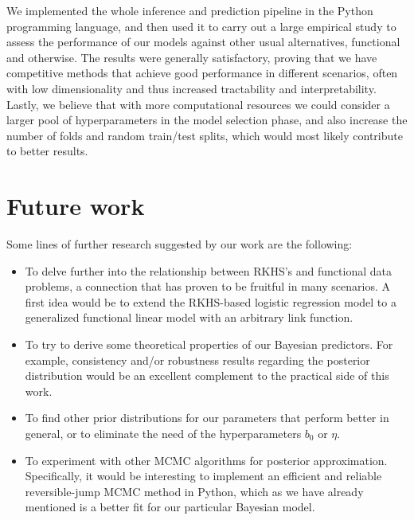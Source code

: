We implemented the whole inference and prediction pipeline in the Python programming language, and then used it to carry out a large empirical study to assess the performance of our models against other usual alternatives, functional and otherwise. The results were generally satisfactory, proving that we have competitive methods that achieve good performance in different scenarios, often with low dimensionality and thus increased tractability and interpretability. Lastly, we believe that with more computational resources we could consider a larger pool of hyperparameters in the model selection phase, and also increase the number of folds and random train/test splits, which would most likely contribute to better results.

\section{Future work}

Some lines of further research suggested by our work are the following:

\begin{itemize}
  \item To delve further into the relationship between RKHS's and functional data problems, a connection that has proven to be fruitful in many scenarios. A first idea would be to extend the RKHS-based logistic regression model to a generalized functional linear model with an arbitrary link function.
  \item To try to derive some theoretical properties of our Bayesian predictors. For example, consistency and/or robustness results regarding the posterior distribution would be an excellent complement to the practical side of this work.
  \item To find other prior distributions for our parameters that perform better in general, or to eliminate the need of the hyperparameters \(b_0\) or \(\eta\).
  \item To experiment with other MCMC algorithms for posterior approximation. Specifically, it would be interesting to implement an efficient and reliable reversible-jump MCMC method in Python, which as we have already mentioned is a better fit for our particular Bayesian model.
\end{itemize}

